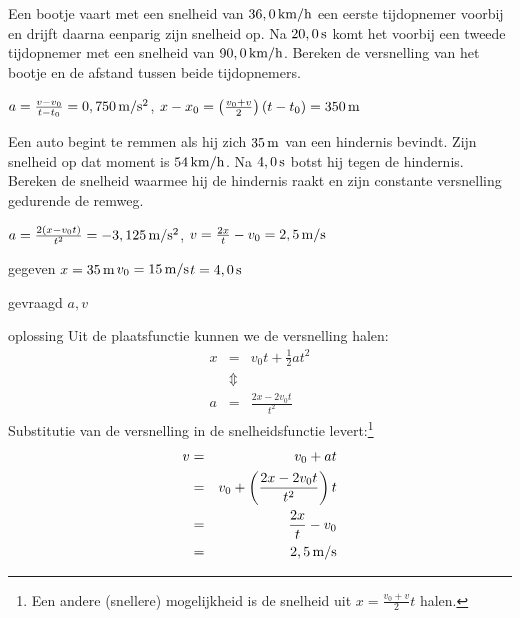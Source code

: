 \begin{exercise} Een bootje vaart met een snelheid van $36,0\rm\,km/h$ een eerste tijdopnemer voorbij en drijft daarna eenparig zijn snelheid op. Na $20,0\rm\,s$ komt het voorbij een tweede tijdopnemer met een snelheid van $90,0\rm\,km/h$. Bereken de versnelling van het bootje en de afstand tussen beide tijdopnemers.
\begin{oplossing}
\newline
$a=\frac{v-v_0}{t-t_0}=0,750\rm\,m/s^2$, $x-x_0=\left(\frac{v_0+v}{2}\right)(t-t_0)=350\rm\,m$
\end{oplossing}

\end{exercise}

\begin{exercise} Een auto begint te remmen als hij zich $35\rm\,m$ van een hindernis bevindt. Zijn snelheid op dat moment is $54\rm\,km/h$. Na $4,0\rm\,s$ botst hij tegen de hindernis. Bereken de snelheid waarmee hij de hindernis raakt en zijn constante versnelling gedurende de remweg.
\begin{oplossing}
$a=\frac{2(x-v_0t)}{t^2}=-3,125\rm\,m/s^2$, $v=\frac{2x}{t}-v_0=2,5\rm\,m/s$
\end{oplossing}
\begin{oplossing}
\item[gegeven]$x=35\rm\,m$\newline$v_0=15\rm\,m/s$\newline$t=4,0\rm\,s$
\item[gevraagd]$a, v$
\item[oplossing]Uit de plaatsfunctie kunnen we de versnelling halen:
\begin{eqnarray*}
x&=&v_0t+\frac{1}{2}at^2\\
&\Updownarrow&\\
a&=&\frac{2x-2v_0t}{t^2}
\end{eqnarray*}
Substitutie van de versnelling in de snelheidsfunctie levert:\footnote{Een andere (snellere) mogelijkheid is de snelheid uit $x=\frac{v_0+v}{2}t$ halen.}
\begin{eqnarray*}
v&=&v_0+at\\
&=&v_0+\left(\frac{2x-2v_0t}{t^2}\right)t\\
&=&\frac{2x}{t}-v_0\\
&=&2,5\rm\,m/s
\end{eqnarray*}
\end{oplossing}

\end{exercise}

